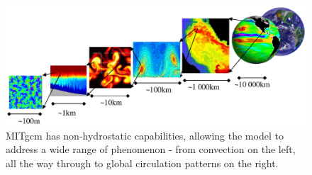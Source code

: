 \begin{figure}
\begin{center}
   \includegraphics*[width=.9\textwidth]{s_overview/figs/scales.eps}
\end{center}
\caption{MITgcm has non-hydrostatic capabilities, allowing
the model to address a wide range of phenomenon - from convection
on the left, all the way through to global circulation patterns on the 
right.
}
\label{fig:all-scales}
\end{figure}
